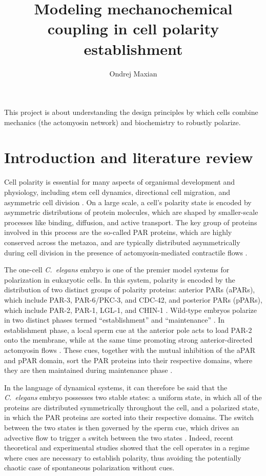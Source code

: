 \documentclass[11pt]{article}
\title{Modeling mechanochemical coupling in cell polarity establishment  \vspace{-0.5 cm}}
\author{Ondrej Maxian  \vspace{-0.75 cm}}
\newcommand{\6}[1]{#1_{\text{6}}}
\newcommand{\3}[1]{#1_{\text{3}}}
\begin{document}
\maketitle
This project is about understanding the design principles by which cells combine mechanics (the actomyosin network) and biochemistry to robustly polarize. 

\section{Introduction and literature review}
Cell polarity is essential for many aspects of organismal development and physiology, including stem cell dynamics, directional cell migration, and asymmetric cell division \cite{dewey2015cell, goldstein2007proteins, ierushalmi2021cytoskeletal, maitre2016asymmetric}. On a large scale, a cell's polarity state is encoded by asymmetric distributions of protein molecules, which are shaped by smaller-scale processes like binding, diffusion, and active transport. The key group of proteins involved in this process are the so-called PAR proteins, which are highly conserved across the metazoa, and are typically distributed asymmetrically during cell division \cite{kemphues1988identification, lang2017proteins} in the presence of actomyosin-mediated contractile flows \cite{munro2004cortical}. 

The one-cell \emph{C.\ elegans} embryo is one of the premier model systems for polarization in eukaryotic cells. In this system, polarity is encoded by the distribution of two distinct groups of polarity proteins: anterior PARs (aPARs), which include PAR-3, PAR-6/PKC-3, and CDC-42, and posterior PARs (pPARs), which include PAR-2, PAR-1, LGL-1, and CHIN-1 \cite{lang2017proteins}. Wild-type embryos polarize in two distinct phases termed ``establishment'' and ``maintenance'' \cite{cuenca2003polarization}. In establishment phase, a local sperm cue at the anterior pole acts to load PAR-2 onto the membrane, while at the same time promoting strong anterior-directed actomyosin flows \cite{gan2021mechanochemical}. These cues, together with the mutual inhibition of the aPAR and pPAR domain, sort the PAR proteins into their respective domains, where they are then maintained during maintenance phase \cite{munro2004cortical, schonegg2006cdc}. 

In the language of dynamical systems, it can therefore be said that the \emph{C.\ elegans} embryo possesses two stable states: a uniform state, in which all of the proteins are distributed symmetrically throughout the cell, and a polarized state, in which the PAR proteins are sorted into their respective domains. The switch between the two states is then governed by the sperm cue, which drives an advective flow to trigger a switch between the two states \cite{goehring2011polarization, gross2019guiding}. Indeed, recent theoretical and experimental studies showed that the cell operates in a regime where cues are necessary to establish polarity, thus avoiding the potentially chaotic case of spontaneous polarization without cues.
\end{document}
